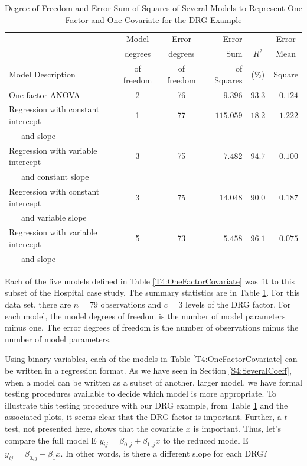 \begin{table}[h]
\caption{\label{T4:DRGModels} Degree of Freedom and Error Sum of
Squares of Several Models to Represent One Factor and One Covariate
for the DRG Example}
\begin{tabular}{lccrcc}
\hline & Model & Error & Error  &  & Error  \\
& degrees & degrees
& Sum & $R^2$  & Mean \\
Model Description & of freedom & of freedom & of Squares & (\%) &
Square
\\ \hline
One factor ANOVA & 2 &
76 & \multicolumn{1}{r}{$9.396$} & \multicolumn{1}{r}{$%
93.3$} & \multicolumn{1}{r}{$0.124$} \\
Regression with constant intercept & 1 & 77 &
\multicolumn{1}{r}{$115.059$} &
\multicolumn{1}{r}{$18.2$} & \multicolumn{1}{r}{$1.222$} \\
~~~and slope & & & & &  \\
Regression with variable intercept &3 & 75 &
\multicolumn{1}{r}{$7.482$} &
\multicolumn{1}{r}{$94.7$} & \multicolumn{1}{r}{$0.100$} \\
~~~and constant slope &  & &  &  &  \\
Regression with constant intercept & 3 & 75 &
\multicolumn{1}{r}{$14.048$} &
\multicolumn{1}{r}{$90.0$} & \multicolumn{1}{r}{$0.187$} \\
~~~and variable slope &  &  &  &  & \\
Regression with variable intercept & 5 & 73 &
\multicolumn{1}{r}{$5.458$} &
\multicolumn{1}{r}{$96.1$} & \multicolumn{1}{r}{$0.075$} \\
~~~and slope &  & & &  &  \\
\hline
\end{tabular}

\end{table}

Each of the five models defined in Table \ref{T4:OneFactorCovariate}
was fit to this subset of the Hospital case study. The summary
statistics are in Table \ref{T4:DRGModels}. For this data set, there
are $n=79$ observations and $c=3$ levels of the DRG factor. For each
model, the model degrees of freedom is the number of model
parameters minus one. The error degrees of freedom is the number of
observations minus the number of model parameters.

Using binary variables, each of the models in Table
\ref{T4:OneFactorCovariate} can be written in a regression format.
As we have seen in Section \ref{S4:SeveralCoeff}, when a model can
be written as a subset of another, larger model, we have formal
testing procedures available to decide which model is more
appropriate. To illustrate this testing procedure with our DRG
example, from Table \ref{T4:DRGModels} and the associated plots, it
seems clear that the DRG factor is important. Further, a $t$-test,
not presented here, shows that the covariate $x$ is important. Thus,
let's compare the full model E $y_{ij} = \beta_{0,j} + \beta_{1,j}x$
to the reduced model E $y_{ij}=\beta_{0,j}+\beta_1x$. In other
words, is there a different slope for each DRG?

